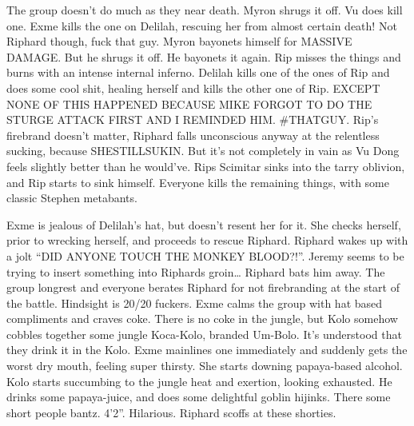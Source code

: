 \begin{multicols}{2}
The group doesn’t do much as they near death. Myron shrugs it off. Vu does kill one. Exme kills the one on Delilah, rescuing her from almost certain death! Not Riphard though, fuck that guy. Myron bayonets himself for MASSIVE DAMAGE. But he shrugs it off. He bayonets it again. Rip misses the things and burns with an intense internal inferno. Delilah kills one of the ones of Rip and does some cool shit, healing herself and kills the other one of Rip. EXCEPT NONE OF THIS HAPPENED BECAUSE MIKE FORGOT TO DO THE STURGE ATTACK FIRST AND I REMINDED HIM. #THATGUY. Rip’s firebrand doesn’t matter, Riphard falls unconscious anyway at the relentless sucking, because SHESTILLSUKIN. But it’s not completely in vain as Vu Dong feels slightly better than he would’ve. Rips Scimitar sinks into the tarry oblivion, and Rip starts to sink himself. Everyone kills the remaining things, with some classic Stephen metabants.\medskip

Exme is jealous of Delilah’s hat, but doesn’t resent her for it. She checks herself, prior to wrecking herself, and proceeds to rescue Riphard. Riphard wakes up with a jolt “DID ANYONE TOUCH THE MONKEY BLOOD?!”. Jeremy seems to be trying to insert something into Riphards groin… Riphard bats him away. The group longrest and everyone berates Riphard for not firebranding at the start of the battle. Hindsight is 20/20 fuckers. Exme calms the group with hat based compliments and craves coke. There is no coke in the jungle, but Kolo somehow cobbles together some jungle Koca-Kolo, branded Um-Bolo. It’s understood that they drink it in the Kolo. Exme mainlines one immediately and suddenly gets the worst dry mouth, feeling super thirsty. She starts downing papaya-based alcohol. Kolo starts succumbing to the jungle heat and exertion, looking exhausted. He drinks some papaya-juice, and does some delightful goblin hijinks. There some short people bantz. 4’2”. Hilarious. Riphard scoffs at these shorties.\medskip


\end{multicols}
